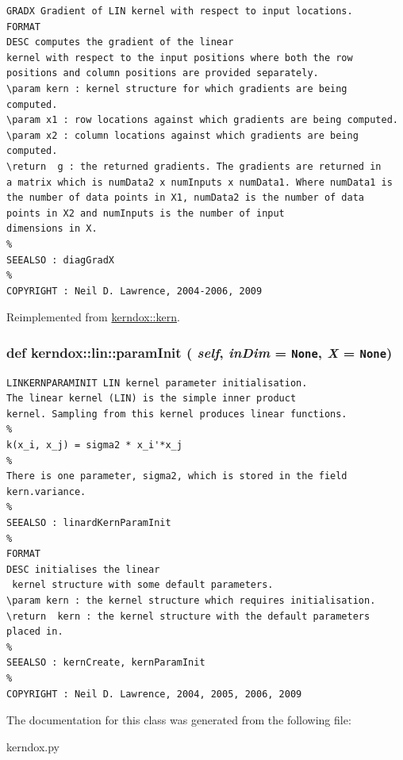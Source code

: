 \footnotesize\begin{verbatim}GRADX Gradient of LIN kernel with respect to input locations.
FORMAT
DESC computes the gradient of the linear
kernel with respect to the input positions where both the row
positions and column positions are provided separately.
\param kern : kernel structure for which gradients are being
computed.
\param x1 : row locations against which gradients are being computed.
\param x2 : column locations against which gradients are being computed.
\return  g : the returned gradients. The gradients are returned in
a matrix which is numData2 x numInputs x numData1. Where numData1 is
the number of data points in X1, numData2 is the number of data
points in X2 and numInputs is the number of input
dimensions in X.
%
SEEALSO : diagGradX
%
COPYRIGHT : Neil D. Lawrence, 2004-2006, 2009\end{verbatim}
\normalsize
 

Reimplemented from \hyperlink{classkerndox_1_1kern}{kerndox::kern}.\hypertarget{classkerndox_1_1lin_bb6282f0591600e43e8d0c14ddfa7ee5}{
\subsubsection[{paramInit}]{\setlength{\rightskip}{0pt plus 5cm}def kerndox::lin::paramInit ( {\em self}, \/   {\em inDim} = {\tt None}, \/   {\em X} = {\tt None})}}
\label{classkerndox_1_1lin_bb6282f0591600e43e8d0c14ddfa7ee5}




\footnotesize\begin{verbatim}LINKERNPARAMINIT LIN kernel parameter initialisation.
The linear kernel (LIN) is the simple inner product
kernel. Sampling from this kernel produces linear functions.
%
k(x_i, x_j) = sigma2 * x_i'*x_j
%
There is one parameter, sigma2, which is stored in the field
kern.variance.
%
SEEALSO : linardKernParamInit
%
FORMAT
DESC initialises the linear
 kernel structure with some default parameters.
\param kern : the kernel structure which requires initialisation.
\return  kern : the kernel structure with the default parameters placed in.
%
SEEALSO : kernCreate, kernParamInit
%
COPYRIGHT : Neil D. Lawrence, 2004, 2005, 2006, 2009

\end{verbatim}
\normalsize
 

The documentation for this class was generated from the following file:\begin{CompactItemize}
\item 
kerndox.py\end{CompactItemize}

